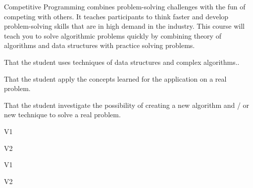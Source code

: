 \begin{syllabus}


\begin{justification}
Competitive Programming combines problem-solving challenges with the fun of competing with others. It teaches participants to think faster and develop problem-solving skills that are in high demand in the industry.
This course will teach you to solve algorithmic problems quickly by combining theory of algorithms and data structures with practice solving problems.
\end{justification}

\begin{goals}
\item That the student uses techniques of data structures and complex algorithms..
\item That the student apply the concepts learned for the application on a real problem.
\item That the student investigate the possibility of creating a new algorithm and / or new technique to solve a real problem.
\end{goals}

\begin{outcomes}{V1}
    \item {}
    \item {}
    \item {}
\end{outcomes}

\begin{outcomes}{V2}
    \item {}
    \item {}
    \item {}
    \item {}
\end{outcomes}

\begin{competences}{V1}
    \item {}
    \item {}
    \item {}
\end{competences}

\begin{competences}{V2}
    \item {}
    \item {}
    \item {}
\end{competences}


\end{syllabus}
